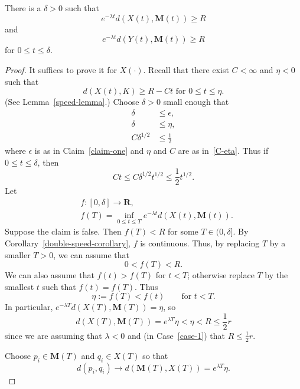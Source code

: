 \documentclass[10pt,a4paper]{amsart}
\newcommand{\MMM}{\mathbf M}
\newcommand{\RR}{\mathbf{R}}  %
\newcommand{\eps}{\epsilon}
\begin{document}
\begin{claim}\label{claim-two}
There is a $\delta>0$ such that 
\[
    e^{-\lambda t} d(X(t),\MMM(t)) \ge R
\]
and
\[
   e^{-\lambda t} d(Y(t),\MMM(t)) \ge R
\]
for $0\le t\le \delta$.
\end{claim}

\begin{proof}
It suffices to prove it for $X(\cdot)$.
Recall that there exist $C<\infty$ and $\eta<0$ such that
\begin{equation}\label{C-eta}
    \text{$d(X(t), K) \ge R - Ct$ for $0\le t\le \eta$.}
\end{equation}
(See Lemma~\ref{speed-lemma}.)
Choose $\delta>0$ small enough that
\begin{align*}
\delta&\le \eps, \\
\delta&\le \eta, \\
C\delta^{1/2} &\le \frac12
\end{align*}
where $\eps$ is as in Claim~\ref{claim-one} and $\eta$ and $C$ are as in~\eqref{C-eta}.
Thus if $0\le t \le \delta$, then
\begin{equation}\label{Ct-small}
  Ct \le C \delta^{1/2} t^{1/2}  \le  \frac12 t^{1/2}.
\end{equation}
Let 
\begin{align*}
&f: [0,\delta] \to \RR, \\
&f(T) = \inf_{0\le t\le T} e^{-\lambda t} d(X(t),\MMM(t)).
\end{align*}
Suppose the claim is false.  Then $f(T)<R$ for some $T\in (0,\delta]$.
 By Corollary~\ref{double-speed-corollary}, $f$
is continuous.
Thus, by replacing $T$ by a smaller $T>0$, we can
assume that 
\[
   0 < f(T) < R.
\]
We can also assume that $f(t)>f(T)$ for $t<T$; otherwise replace $T$
by the smallest $t$ such that $f(t)=f(T)$.
Thus
\[
   \eta:=f(T) < f(t) \qquad\text{for $t<T$}.
\]
In particular, $e^{-\lambda T} d(X(T),\MMM(T)) =\eta$,
so
\begin{equation}\label{close-enough}
d(X(T),\MMM(T)) = e^{\lambda T}\eta < \eta < R \le \frac12r
\end{equation}
since we are assuming that $\lambda<0$ and (in Case~\ref{case-1}) that $R\le \frac12r$.




Choose $p_i\in \MMM(T)$ and $q_i\in X(T)$ so that
\[
   d(p_i,q_i) \to d(\MMM(T),X(T)) = e^{\lambda T}\eta.
\]


\end{proof}
\end{document}
